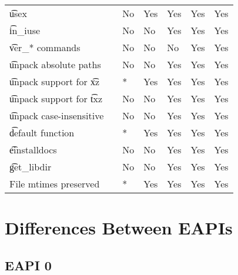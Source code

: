 \begin{landscape}
\begin{longtable}{llP{7.5em}P{7.5em}P{7.5em}P{7.5em}P{7.5em}}
\t{usex} &  &
    No & Yes & Yes & Yes & Yes \\

\t{in_iuse} &  &
    No & No & Yes & Yes & Yes \\

\t{ver_*} commands &  &
    No & No & No & Yes & Yes \\

\t{unpack} absolute paths &  &
    No & No & Yes & Yes & Yes \\

\t{unpack} support for \t{xz} &  &
    * & Yes & Yes & Yes & Yes \\

\t{unpack} support for \t{txz} &  &
    No & No & Yes & Yes & Yes \\

\t{unpack} case-insensitive &  &
    No & No & Yes & Yes & Yes \\

\t{default} function &  &
    * & Yes & Yes & Yes & Yes \\

\t{einstalldocs} &  &
    No & No & Yes & Yes & Yes \\

\t{get_libdir} &  &
    No & No & Yes & Yes & Yes \\

File mtimes preserved &  &
    * & Yes & Yes & Yes & Yes \\

\end{longtable}
\end{landscape}

\chapter{Differences Between EAPIs}


\section{EAPI 0}

